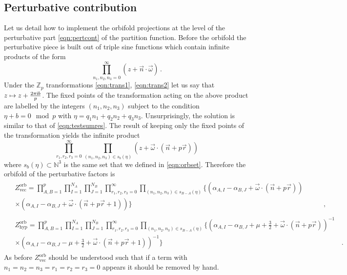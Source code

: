 \documentclass[main.tex]{subfiles}
\begin{document}
\subsection{Perturbative contribution}
Let us detail how to implement the orbifold projections at the level of the perturbative part \eqref{eqn:pertcont} of the partition function. Before the orbifold the perturbative piece is built out of triple sine functions which contain infinite products of the form 
\begin{equation}
\prod_{n_1,n_2,n_3=0}^{\infty}\left(z+\vec{n}\cdot\vec{\omega}\right)\,.
\end{equation}
Under the $\mathbb{Z}_p$ transformations \eqref{eqn:trans1}, \eqref{eqn:trans2} let us say that $z\mapsto z+\frac{2\pi\mathrm{i} b}{p}$. The fixed points of the transformation acting on the above product are labelled by the integers $(n_1,n_2,n_3)$ subject to the condition $\eta+b=0\mod p$ with $\eta=q_1n_1+q_{2}n_2+q_{3}n_3$. Unsurprisingly, the solution is similar to that of \eqref{eqn:testsumres}. The result of keeping only the fixed points of the transformation yields the infinite product
\begin{equation}
\prod_{r_1,r_2,r_3=0}^{\infty}\prod_{(n_1,n_2,n_3)\in s_b(\eta)}\left(z+\vec{\omega}\cdot(\vec{n}+p\vec{r})\right)
\end{equation}
where $s_b(\eta)\subset\mathbb{N}^3$ is the same set that we defined in \eqref{eqn:orbset}. Therefore the orbifold of the perturbative factors is
\begin{align}
&\begin{aligned}
Z_{\text{vec}}^{\text{orb}}=\prod_{A,B=1}^p\prod_{I=1}^{N_A}\prod_{J=1}^{N_B}\prod_{r_1,r_2,r_3=0}^{\infty}\prod_{(n_1,n_2,n_3)\in s_{B-A}(\eta)}\bigg\{\left(\alpha_{A,I}-\alpha_{B,J}+\vec{\omega}\cdot(\vec{n}+p\vec{r})\right)\qquad&\\
\times\left(\alpha_{A,I}-\alpha_{B,J}+\vec{\omega}\cdot(\vec{n}+p\vec{r}+1)\right)\bigg\}&\,,
\end{aligned}
\label{eqn:pertvecorb}
\\
&\begin{aligned}
Z_{\text{hyp}}^{\text{orb}}=\prod_{A,B=1}^p\prod_{I=1}^{N_A}\prod_{J=1}^{N_B}\prod_{r_1,r_2,r_3=0}^{\infty}\prod_{(n_1,n_2,n_3)\in s_{B-A}(\eta)}\bigg\{\left(\alpha_{A,I}-\alpha_{B,J}+\mu+\frac{3}{2}+\vec{\omega}\cdot(\vec{n}+p\vec{r})\right)^{-1}&\\
\times\left(\alpha_{A,I}-\alpha_{B,J}-\mu+\frac{3}{2}+\vec{\omega}\cdot(\vec{n}+p\vec{r}+1)\right)^{-1}\bigg\}&\,.
\end{aligned}\label{eqn:perthyporb}
\end{align}
As before $Z_{\text{vec}}^{\text{orb}}$ should be understood such that if a term with $n_1=n_2=n_3=r_1=r_2=r_3=0$ appears it should be removed by hand.
\end{document}
